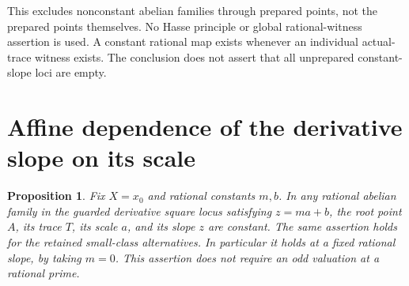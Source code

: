\documentclass[11pt,a4paper]{article}
\newtheorem{proposition}[theorem]{Proposition}
\begin{document}
This excludes nonconstant abelian families through prepared points,
not the prepared points themselves. No Hasse principle or global
rational-witness assertion is used. A constant rational map exists
whenever an individual actual-trace witness exists. The conclusion
does not assert that all unprepared constant-slope loci are empty.

\section{Affine dependence of the derivative slope on its scale}

\begin{proposition}\label{prop:constant-root}
Fix $X=x_0$ and rational constants $m,b$. In any rational abelian
family in the guarded derivative square locus satisfying
$z=ma+b$, the root point $A$, its trace $T$, its scale $a$,
and its slope $z$ are constant. The same assertion holds for the
retained small-class alternatives. In particular it holds at a
fixed rational slope, by taking $m=0$.
This assertion does not require an odd valuation at a rational prime.
\end{proposition}
\end{document}
